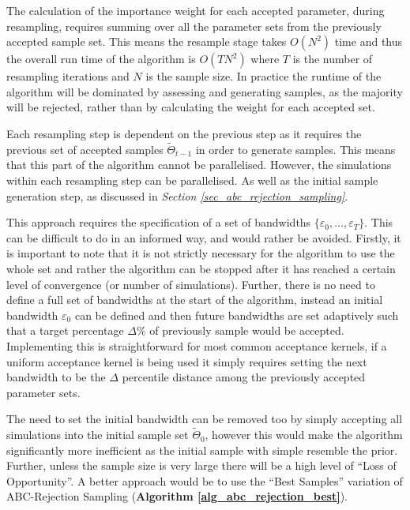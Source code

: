 \documentclass[11pt,a4paper]{article}
\theoremstyle{break}
\begin{document}
  \par The calculation of the importance weight for each accepted parameter, during resampling, requires summing over all the parameter sets from the previously accepted sample set. This means the resample stage takes $O(N^2)$ time and thus the overall run time of the algorithm is $O(TN^2)$ where $T$ is the number of resampling iterations and $N$ is the sample size. In practice the runtime of the algorithm will be dominated by assessing and generating samples, as the majority will be rejected, rather than by calculating the weight for each accepted set.

  \par Each resampling step is dependent on the previous step as it requires the previous set of accepted samples $\tilde\Theta_{t-1}$ in order to generate samples. This means that this part of the algorithm cannot be parallelised. However, the simulations within each resampling step can be parallelised. As well as the initial sample generation step, as discussed in \textit{Section \ref{sec_abc_rejection_sampling}}.

  \par This approach requires the specification of a set of bandwidths $\{\varepsilon_0,\dots,\varepsilon_T\}$. This can be difficult to do in an informed way, and would rather be avoided. Firstly, it is important to note that it is not strictly necessary for the algorithm to use the whole set and rather the algorithm can be stopped after it has reached a certain level of convergence (or number of simulations). Further, there is no need to define a full set of bandwidths at the start of the algorithm, instead an initial bandwidth $\varepsilon_0$ can be defined and then future bandwidths are set adaptively such that a target percentage $\Delta\%$ of previously sample would be accepted. Implementing this is straightforward for most common acceptance kernels, if a uniform acceptance kernel is being used it simply requires setting the next bandwidth to be the $\Delta$ percentile distance among the previously accepted parameter sets.

  \par The need to set the initial bandwidth can be removed too by simply accepting all simulations into the initial sample set $\tilde\Theta_0$, however this would make the algorithm significantly more inefficient as the initial sample with simple resemble the prior. Further, unless the sample size is very large there will be a high level of ``Loss of Opportunity''. A better approach would be to use the ``Best Samples'' variation of ABC-Rejection Sampling (\textbf{Algorithm \ref{alg_abc_rejection_best}}).
\end{document}
